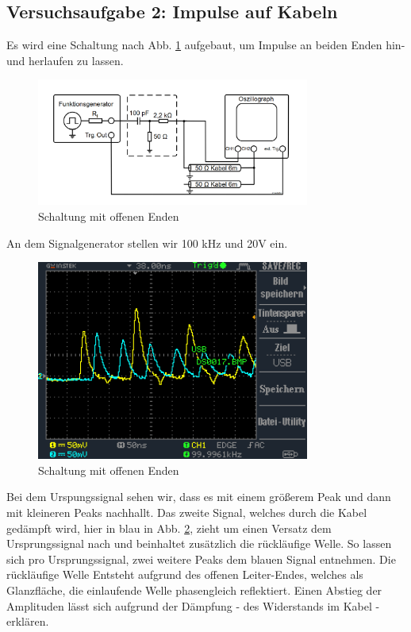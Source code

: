 \documentclass[a4paper,10pt]{article}
\numberwithin{equation}{section}
\begin{document}
\subsection{Versuchsaufgabe 2: Impulse auf Kabeln}
Es wird eine Schaltung nach Abb. \ref{fig:2.1} aufgebaut, um Impulse an beiden Enden hin- und herlaufen zu lassen.
\begin{figure}[h]
        \centering
        \includegraphics[width=0.8\textwidth]{Schaltung_offen.png}
        \caption{Schaltung mit offenen Enden}
		\label{fig:2.1}
\end{figure}
An dem Signalgenerator stellen wir 100 kHz und 20V ein.
\begin{figure}[h]
        \centering
        \includegraphics[width=0.8\textwidth]{data/DS0017.BMP.png}
        \caption{Schaltung mit offenen Enden}
		\label{fig:2.2}
\end{figure}
Bei dem Urspungssignal sehen wir, dass es mit einem größerem Peak und dann mit kleineren Peaks nachhallt. Das zweite Signal, welches durch die Kabel gedämpft wird, hier in blau in Abb. \ref{fig:2.2}, zieht um einen Versatz dem Ursprungssignal nach und beinhaltet zusätzlich die rückläufige Welle. So lassen sich pro Ursprungssignal, zwei weitere Peaks dem blauen Signal entnehmen. Die rückläufige Welle Entsteht aufgrund des offenen Leiter-Endes, welches als Glanzfläche, die einlaufende Welle phasengleich reflektiert. Einen Abstieg der Amplituden lässt sich aufgrund der Dämpfung - des Widerstands im Kabel - erklären.
\end{document}
